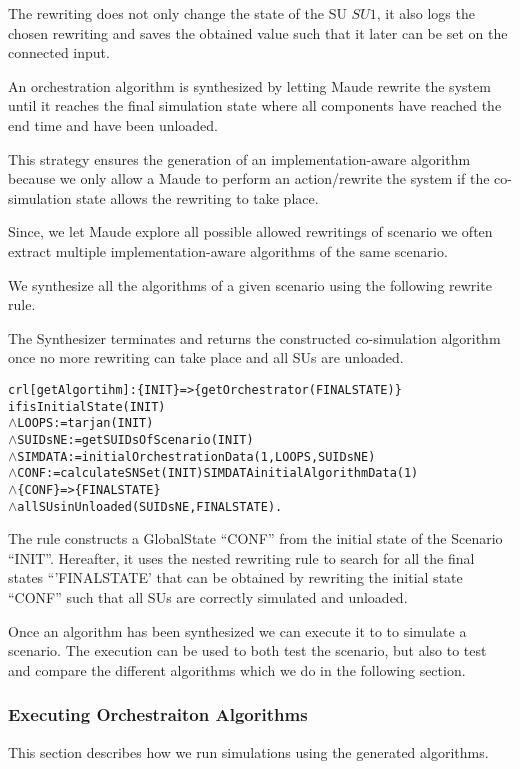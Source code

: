 The rewriting does not only change the state of the SU $SU1$, it also logs the chosen rewriting and saves the obtained value such that it later can be set on the connected input.

An orchestration algorithm is synthesized by letting Maude rewrite the system until it reaches the final simulation state where all components have reached the end time and have been unloaded.

This strategy ensures the generation of an implementation-aware algorithm because we only allow a Maude to perform an action/rewrite the system if the co-simulation state allows the rewriting to take place.

Since, we let Maude explore all possible allowed rewritings of scenario we often extract multiple implementation-aware algorithms of the same scenario.

We synthesize all the algorithms of a given scenario using the following rewrite rule.

The Synthesizer terminates and returns the constructed co-simulation algorithm once no more rewriting can take place and all SUs are unloaded.

\begin{alltt}
  \small
crl [getAlgortihm]: \{ INIT \} => \{ getOrchestrator(FINALSTATE) \}
if isInitialState(INIT)
  \(\land\) LOOPS := tarjan(INIT)
  \(\land\) SUIDsNE := getSUIDsOfScenario(INIT)
  \(\land\) SIMDATA := initialOrchestrationData(1,LOOPS,SUIDsNE)
  \(\land\) CONF := calculateSNSet(INIT) SIMDATA initialAlgorithmData(1)
  \(\land\) \{CONF\} => \{ FINALSTATE\} 
  \(\land\) allSUsinUnloaded(SUIDsNE, FINALSTATE) .
\end{alltt}


The rule constructs a GlobalState ``CONF'' from the initial state of the Scenario ``INIT''.
Hereafter, it uses the nested  rewriting rule to search for all the final states ``'FINALSTATE' that can be obtained by rewriting the initial state ``CONF'' such that all SUs are correctly simulated and unloaded.

Once an algorithm has been synthesized we can execute it to to simulate a scenario.
The execution can be used to both test the scenario, but also to test and compare the different algorithms which we do in the following section.

\subsubsection{Executing Orchestraiton Algorithms}
This section describes how we run simulations using the generated algorithms.


